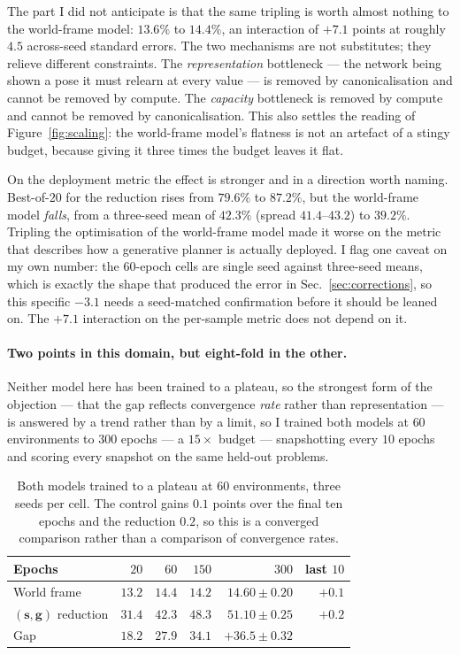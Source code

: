 \documentclass[11pt,a4paper]{article}
\newcommand{\toprule}{\hline}
\newcommand{\midrule}{\hline}
\newcommand{\bottomrule}{\hline}
\newcommand{\svec}{\mathbf{s}}
\newcommand{\gvec}{\mathbf{g}}
\begin{document}
The part I did not anticipate is that the same tripling is worth almost nothing
to the world-frame model: $13.6\%$ to $14.4\%$, an interaction of $+7.1$ points at
roughly $4.5$ across-seed standard errors. The two mechanisms are not
substitutes; they relieve different constraints. The \emph{representation}
bottleneck --- the network being shown a pose it must relearn at every value ---
is removed by canonicalisation and cannot be removed by compute. The
\emph{capacity} bottleneck is removed by compute and cannot be removed by
canonicalisation. This also settles the reading of Figure~\ref{fig:scaling}: the
world-frame model's flatness is not an artefact of a stingy budget, because giving
it three times the budget leaves it flat.

On the deployment metric the effect is stronger and in a direction worth naming.
Best-of-$20$ for the reduction rises from $79.6\%$ to $87.2\%$, but the
world-frame model \emph{falls}, from a three-seed mean of $42.3\%$ (spread
$41.4$--$43.2$) to $39.2\%$. Tripling the optimisation of the world-frame model made
it worse on the metric that describes how a generative planner is actually
deployed. I flag one caveat on my own number: the $60$-epoch cells are single
seed against three-seed means, which is exactly the shape that produced the error
in Sec.~\ref{sec:corrections}, so this specific $-3.1$ needs a seed-matched
confirmation before it should be leaned on. The $+7.1$ interaction on the
per-sample metric does not depend on it.

\paragraph{Two points in this domain, but eight-fold in the other.} Neither model
here has been trained to a plateau, so the strongest form of the objection ---
that the gap reflects convergence \emph{rate} rather than representation --- is
answered by a trend rather than by a limit, so I trained both models at $60$
environments to $300$ epochs --- a $15\times$ budget --- snapshotting every $10$
epochs and scoring every snapshot on the same held-out problems.

\begin{table}[t]
\centering
\begin{tabular}{lrrrrr}
\toprule
Epochs & $20$ & $60$ & $150$ & $300$ & last $10$ \\
\midrule
World frame               & $13.2$ & $14.4$ & $14.2$ & $14.60\pm0.20$ & $+0.1$ \\
$(\svec,\gvec)$ reduction & $31.4$ & $42.3$ & $48.3$ & $\mathbf{51.10\pm0.25}$ & $+0.2$ \\
\midrule
Gap                       & $18.2$ & $27.9$ & $34.1$ & $\mathbf{+36.5\pm0.32}$ & \\
\bottomrule
\end{tabular}
\caption{Both models trained to a plateau at $60$ environments, three seeds per
cell. The control gains $0.1$ points over the final ten epochs and the reduction
$0.2$, so this is a converged comparison rather than a comparison of convergence
rates.}
\label{tab:converged}
\end{table}
\end{document}
